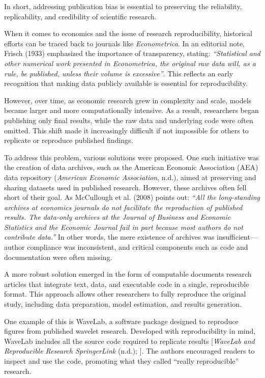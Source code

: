 \documentclass[
  british,
  a4paper,
]{article}
\begin{document}
In short, addressing publication bias is essential to preserving the
reliability, replicability, and credibility of scientific research.

When it comes to economics and the issue of research reproducibility,
historical efforts can be traced back to journals like
\emph{Econometrica}. In an editorial note, Frisch (1933) emphasized the
importance of transparency, stating: \emph{``Statistical and other
numerical work presented in Econometrica, the original raw data will, as
a rule, be published, unless their volume is excessive''}. This reflects
an early recognition that making data publicly available is essential
for reproducibility.

However, over time, as economic research grew in complexity and scale,
models became larger and more computationally intensive. As a result,
researchers began publishing only final results, while the raw data and
underlying code were often omitted. This shift made it increasingly
difficult if not impossible for others to replicate or reproduce
published findings.

To address this problem, various solutions were proposed. One such
initiative was the creation of data archives, such as the American
Economic Association (AEA) data repository (\emph{American {Economic
Association}}, n.d.), aimed at preserving and sharing datasets used in
published research. However, these archives often fell short of their
goal. As McCullough et al. (2008) points out: \emph{``All the
long-standing archives at economics journals do not facilitate the
reproduction of published results. The data-only archives at the Journal
of Business and Economic Statistics and the Economic Journal fail in
part because most authors do not contribute data.''} In other words, the
mere existence of archives was insufficient---author compliance was
inconsistent, and critical components such as code and documentation
were often missing.

A more robust solution emerged in the form of computable documents
research articles that integrate text, data, and executable code in a
single, reproducible format. This approach allows other researchers to
fully reproduce the original study, including data preparation, model
estimation, and results generation.

One example of this is WaveLab, a software package designed to reproduce
figures from published wavelet research. Developed with reproducibility
in mind, WaveLab includes all the source code required to replicate
results {[}\emph{WaveLab and Reproducible Research \textbar{}
SpringerLink} (n.d.); {]}. The authors encouraged readers to inspect and
use the code, promoting what they called ``really reproducible''
research.
\end{document}
